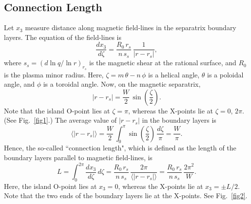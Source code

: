 \documentclass[12pt,prb,aps]{revtex4-1}
\begin{document}
\subsection{Connection Length}
Let $x_3$ measure distance along magnetic field-lines in the separatrix boundary layers. The equation of the field-lines is\,\cite{rf}
\begin{equation}
\frac{dx_3}{d\zeta} =\frac{R_0\,r_s}{n\,s_s}\,\frac{1}{|r-r_s|},
\end{equation}
where $s_s = (d\ln q/\ln r)_{r_s}$ is the magnetic shear at the rational surface, and $R_0$ is the plasma minor radius. Here, $\zeta=m\,\theta-n\,\phi$ is a helical angle, $\theta$ is
a poloidal angle, and $\phi$ is a toroidal angle. 
 Now, on the magnetic separatrix,\cite{rf}
\begin{equation}
|r-r_s| = \frac{W}{2}\,\sin\left(\frac{\zeta}{2}\right).
\end{equation}
Note that the island O-point lies at $\zeta=\pi$, whereas the X-points lie at $\zeta=0$, $2\pi$. (See Fig.~\ref{fig1}.) The average value of $|r-r_s|$ in the boundary layers is
\begin{equation}
\langle |r-r_s|\rangle  =\frac{W}{2}\,\int_0^\pi \sin\left(\frac{\zeta}{2}\right)\,\frac{d\zeta}{\pi}= \frac{W}{\pi}.
\end{equation}
Hence, the so-called ``connection length", which is defined as the length of the boundary layers parallel to magnetic field-lines, is
\begin{equation}
L = \int_0^{2\pi}\frac{dx_3}{d\zeta}\,d\zeta = \frac{R_0\,r_s}{n\,s_s}\,\frac{2\pi}{\langle|r-r_s|\rangle} = \frac{R_0\,r_s}{n\,s_s}\,\frac{2\pi^2}{W}.
\end{equation}
Here, the island O-point lies at $x_3=0$, whereas the X-points lie at $x_3=\pm L/2$. Note that the two ends of the boundary layers lie at the X-points. See Fig.~\ref{fig2}.
\end{document}
